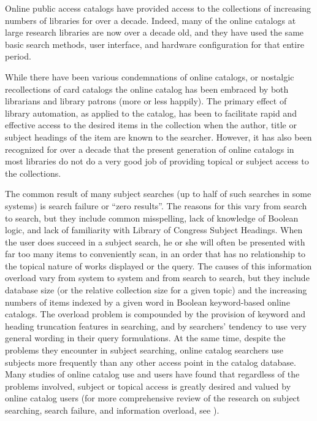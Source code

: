 Online public access catalogs have provided access to the collections
of increasing numbers of libraries for over a decade. Indeed, many of
the online catalogs at large research libraries are now over a decade
old, and they have used the same basic search methods, user interface,
and hardware configuration for that entire period.

While there have been various condemnations of online catalogs, or
nostalgic recollections of card catalogs\cite{BAKER} the online
catalog has been embraced by both librarians and library patrons (more
or less happily). The primary effect of library automation, as applied
to the catalog, has been to facilitate rapid and effective access to
the desired items in the collection when the author, title or subject
headings of the item are known to the searcher. However, it has also
been recognized for over a decade that the present generation of
online catalogs in most libraries do not do a very good job of
providing topical or subject access to the collections\cite{MATTHEWS}.

The common result of many subject searches (up to half of such
searches in some systems) is search failure or ``zero results''. The
reasons for this vary from search to search, but they include common
misspelling, lack of knowledge of Boolean logic, and lack of
familiarity with Library of Congress Subject Headings. When the user
does succeed in a subject search, he or she will often be presented
with far too many items to conveniently scan, in an order that has no
relationship to the topical nature of works displayed or the
query. The causes of this information overload vary from system to
system and from search to search, but they include database size (or
the relative collection size for a given topic) and the increasing
numbers of items indexed by a given word in Boolean keyword-based
online catalogs. The overload problem is compounded by the provision
of keyword and heading truncation features in searching, and by
searchers' tendency to use very general wording in their query
formulations.  At the same time, despite the problems they encounter
in subject searching, online catalog searchers use subjects more
frequently than any other access point in the catalog database. Many
studies of online catalog use and users have found that regardless of
the problems involved, subject or topical access is greatly desired
and valued by online catalog users (for more comprehensive review of
the research on subject searching, search failure, and information
overload, see \cite{SCYLLA}).

